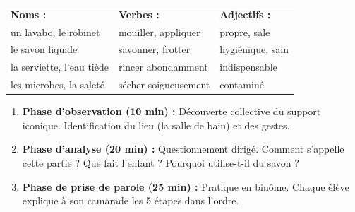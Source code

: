 \documentclass[a4paper,10pt]{article}
\begin{document}
\vspace{3pt}

\begin{tcolorbox}[
  enhanced,
  colback=white,
  colframe=cardborder,
  arc=2mm,boxrule=0.8pt,
  top=4pt,bottom=4pt,left=8pt,right=8pt,
  title={\small\textbf{\textcolor{primary}{\faTools\ Boîte à outils lexicale pour l'expression orale}}},
  coltitle=primary,colbacktitle=primarylight,titlerule=0.5pt,titlerule style=cardborder
]
{\small
\begin{tabularx}{\linewidth}{X X X}
\textbf{\textcolor{secondary}{Noms :}} & \textbf{\textcolor{secondary}{Verbes :}} & \textbf{\textcolor{secondary}{Adjectifs :}} \\
un lavabo, le robinet & mouiller, appliquer & propre, sale \\
le savon liquide & savonner, frotter & hygiénique, sain \\
la serviette, l'eau tiède & rincer abondamment & indispensable \\
les microbes, la saleté & sécher soigneusement & contaminé \\
\end{tabularx}
}
\end{tcolorbox}

\vspace{3pt}

\begin{tcolorbox}[
  enhanced,
  colback=neutrallight,
  colframe=cardborder,
  arc=1.5mm,boxrule=0.6pt,
  top=4pt,bottom=4pt,left=7pt,right=7pt,
  title={\small\textbf{\textcolor{primary}{\faChalkboardTeacher\ Déroulement de l'activité en classe}}},
  coltitle=primary,colbacktitle=white,titlerule=0.4pt
]
{\footnotesize
\begin{enumerate}[label=\textbf{\arabic*.},leftmargin=*,noitemsep,topsep=1pt]
  \item \textbf{Phase d'observation (10 min) :} Découverte collective du support iconique. Identification du lieu (la salle de bain) et des gestes.
  \item \textbf{Phase d'analyse (20 min) :} Questionnement dirigé. Comment s'appelle cette partie ? Que fait l'enfant ? Pourquoi utilise-t-il du savon ?
  \item \textbf{Phase de prise de parole (25 min) :} Pratique en binôme. Chaque élève explique à son camarade les 5 étapes dans l'ordre.
\end{enumerate}
}
\end{tcolorbox}
\end{document}
